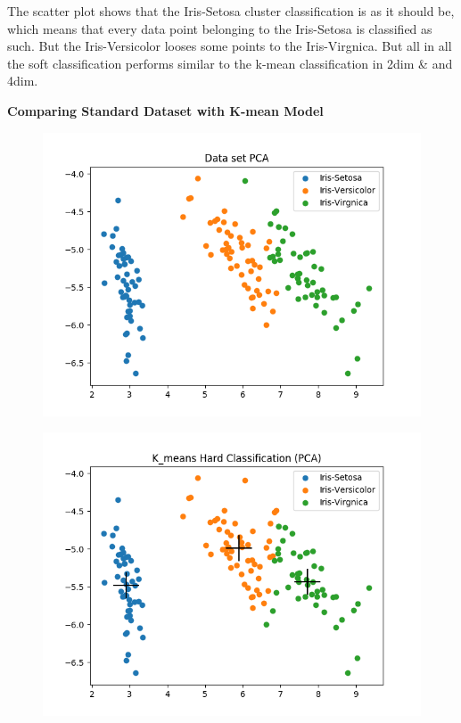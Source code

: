 \documentclass[a4paper]{article}
\begin{document}
\noindent
The scatter plot shows that the Iris-Setosa cluster classification is as it should be, which means that every data point belonging to the  Iris-Setosa is classified as such. But the Iris-Versicolor looses some points to the Iris-Virgnica. But all in all the soft classification performs similar to the k-mean classification in 2dim \& and 4dim.

\newpage

{\large \textbf{Comparing Standard Dataset with K-mean Model}} \\

  
\begin{figure}[htp]
\centering
\begin{minipage}{0.4\textwidth}
  \includegraphics[scale=0.5]{plots/basic_scenario3_cmpnt3.png}
  \label{fig:16}
\end{minipage}
\hfill
\begin{minipage}{0.4\textwidth}
  \includegraphics[scale=0.5]{plots/hard_classification_scenario3_cmpnt3.png}
  \label{fig:17}
\end{minipage}
\end{figure}
\end{document}
